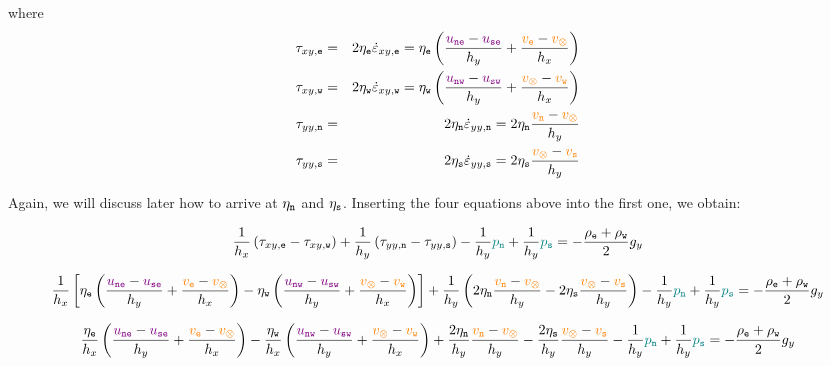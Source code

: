 where
\begin{eqnarray}
\tau_{xy,{\tt e}} 
&=& 2 \eta_{\tt e} \dot{\varepsilon}_{xy,{\tt e}} 
= \eta_{\tt e} \left( \frac{{\color{violet} u_{\tt ne}}-{\color{violet} u_{\tt se}}}{h_y} 
+\frac{{\color{orange} v_{\tt e}}-{\color{orange} v_\otimes}}{h_x} \right) 
\nonumber \\
\tau_{xy,{\tt w}} 
&=& 2 \eta_{\tt w} \dot{\varepsilon}_{xy,{\tt w}} 
= \eta_{\tt w} \left( \frac{{\color{violet} u_{\tt nw}}-{\color{violet} u_{\tt sw}}}{h_y} 
+\frac{{\color{orange} v_\otimes} - {\color{orange} v_{\tt w}}}{h_x} \right) 
\nonumber\\
\tau_{yy,{\tt n}} 
&=& 2 \eta_{\tt n} \dot{\varepsilon}_{yy,{\tt n}} 
= 2\eta_{\tt n} \frac{{\color{orange} v_{\tt n}}-{\color{orange} v_\otimes}}{h_y} 
\nonumber\\
\tau_{yy,{\tt s}} 
&=& 2 \eta_{\tt s} \dot{\varepsilon}_{yy,{\tt s}} 
= 2\eta_{\tt s} \frac{{\color{orange} v_\otimes} -{\color{orange} v_{\tt s}}}{h_y} 
 \nonumber
\end{eqnarray}

Again, we will discuss later how to arrive at $\eta_{\tt n}$ and $\eta_{\tt s}$.
Inserting the four equations above into the first one, we obtain:



\[
\frac{1}{h_x} \left(\tau_{xy,{\tt e}}-\tau_{xy,{\tt w}}\right) + 
\frac{1}{h_y} \left(\tau_{yy,{\tt n}}-\tau_{yy,{\tt s}}\right)
-\frac{1}{h_y} {\color{teal}p_{\tt n}} + \frac{1}{h_y} {\color{teal}p_{\tt s}}
= -\frac{\rho_{\tt e}+\rho_{\tt w}}{2} g_y
\]



{\footnotesize
\[
\frac{1}{h_x} \left[
\eta_{\tt e} \left( \frac{{\color{violet} u_{\tt ne}}-{\color{violet} u_{\tt se}}}{h_y} 
+\frac{{\color{orange} v_{\tt e}}-{\color{orange} v_\otimes}}{h_x} \right) 
-
\eta_{\tt w} \left( \frac{{\color{violet} u_{\tt nw}}-{\color{violet} u_{\tt sw}}}{h_y} 
+\frac{{\color{orange} v_\otimes} - {\color{orange} v_{\tt w}}}{h_x} \right) 
\right] 
+
\frac{1}{h_y} \left(
2\eta_{\tt n} \frac{{\color{orange} v_{\tt n}}-{\color{orange} v_\otimes}}{h_y} 
-
2\eta_{\tt s} \frac{{\color{orange} v_\otimes} -{\color{orange} v_{\tt s}}}{h_y}
\right)
-\frac{1}{h_y} {\color{teal}p_{\tt n}} + \frac{1}{h_y} {\color{teal}p_{\tt s}}
= -\frac{\rho_{\tt e}+\rho_{\tt w}}{2} g_y
\]
}





{\footnotesize
\[
\frac{\eta_{\tt e}}{h_x} 
 \left( \frac{{\color{violet} u_{\tt ne}}-{\color{violet} u_{\tt se}}}{h_y} 
+\frac{{\color{orange} v_{\tt e}}-{\color{orange} v_\otimes}}{h_x} \right) 
-
\frac{\eta_{\tt w}}{h_x} \left( \frac{{\color{violet} u_{\tt nw}}-{\color{violet} u_{\tt sw}}}{h_y} 
+\frac{{\color{orange} v_\otimes} - {\color{orange} v_{\tt w}}}{h_x} \right) 
+
\frac{2\eta_{\tt n}}{h_y} 
 \frac{{\color{orange} v_{\tt n}}-{\color{orange} v_\otimes}}{h_y} 
-
\frac{2\eta_{\tt s}}{h_y}   \frac{{\color{orange} v_\otimes} -{\color{orange} v_{\tt s}}}{h_y}
-\frac{1}{h_y} {\color{teal}p_{\tt n}} + \frac{1}{h_y} {\color{teal}p_{\tt s}}
= -\frac{\rho_{\tt e}+\rho_{\tt w}}{2} g_y
\]
}

